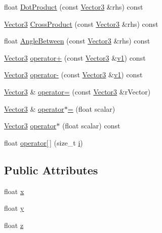 \begin{DoxyCompactItemize}
\item 
float \hyperlink{class_vector3_a8c1f2fa153205aa129aabef7c89cef61}{Dot\+Product} (const \hyperlink{class_vector3}{Vector3} \&rhs) const 
\item 
\hyperlink{class_vector3}{Vector3} \hyperlink{class_vector3_a49712c84065d54dfd3c93a905db1110b}{Cross\+Product} (const \hyperlink{class_vector3}{Vector3} \&rhs) const 
\item 
float \hyperlink{class_vector3_ae3eee513e7f547d7e88837db44bec737}{Angle\+Between} (const \hyperlink{class_vector3}{Vector3} \&rhs) const 
\item 
\hyperlink{class_vector3}{Vector3} \hyperlink{class_vector3_ab30b26971bc8e566d13d2311cc578a3c}{operator+} (const \hyperlink{class_vector3}{Vector3} \&\hyperlink{glext_8h_a435c176a02c061b43e19bdf7c86cceae}{v1}) const 
\item 
\hyperlink{class_vector3}{Vector3} \hyperlink{class_vector3_a5a8b19645bb9837d0b637d6d212d095c}{operator-\/} (const \hyperlink{class_vector3}{Vector3} \&\hyperlink{glext_8h_a435c176a02c061b43e19bdf7c86cceae}{v1}) const 
\item 
\hyperlink{class_vector3}{Vector3} \& \hyperlink{class_vector3_aedb0fcbe51b139e9299311bce133fe90}{operator=} (const \hyperlink{class_vector3}{Vector3} \&r\+Vector)
\item 
\hyperlink{class_vector3}{Vector3} \& \hyperlink{class_vector3_ab337fe4b0c5fd44657f42427e265c982}{operator$\ast$=} (float scalar)
\item 
\hyperlink{class_vector3}{Vector3} \hyperlink{class_vector3_ab8bb1a236776d951a2e43b3ca9448bb2}{operator$\ast$} (float scalar) const 
\item 
float \hyperlink{class_vector3_a7fbc8e9db7df7cf5b49f9f6ff3f73e55}{operator\mbox{[}$\,$\mbox{]}} (size\+\_\+t \hyperlink{class_vector3_a96074c1245025a7b6d345a63548033b7}{i})
\end{DoxyCompactItemize}
\subsection*{Public Attributes}
\begin{DoxyCompactItemize}
\item 
float \hyperlink{class_vector3_a7e2d3237b29a2f29d7b3d8b2934e35f2}{x}
\item 
float \hyperlink{class_vector3_a86eb35a9fa2d5a49e7fad66a35fa9c13}{y}
\item 
float \hyperlink{class_vector3_aa8c9461eb24bd2c364258078811a3e9d}{z}
\end{DoxyCompactItemize}
